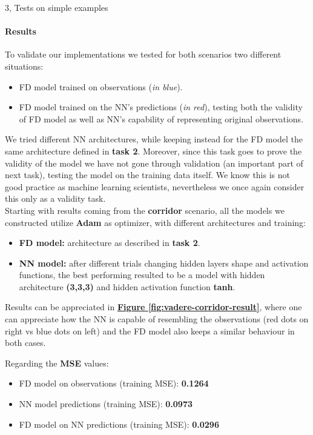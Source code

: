 \documentclass[10pt,a4paper]{article}
\begin{document}
\begin{task}{3, Tests on simple examples}
\paragraph{Results}
To validate our implementations we tested for both scenarios two different situations:
\begin{itemize}
    \item FD model trained on observations (\textit{in blue}).
    \item FD model trained on the NN's predictions (\textit{in red}), testing both the validity of FD model as well as NN's capability of representing original observations.
\end{itemize}
We tried different NN architectures, while keeping instead for the FD model the same architecture defined in \textbf{task 2}.
Moreover, since this task goes to prove the validity of the model we have not gone through validation (an important part of next task), testing the model on the training data itself. We know this is not good practice as machine learning scientists, nevertheless we once again consider this only as a validity task.\\
Starting with results coming from the \textbf{corridor} scenario, all the models we constructed utilize \textbf{Adam} as optimizer, with different architectures and training:
\begin{itemize}
    \item \textbf{FD model:} architecture as described in \textbf{task 2}.
    \item \textbf{NN model:} after different trials changing hidden layers shape and activation functions, the best performing resulted to be a model with hidden architecture \textbf{(3,3,3)} and hidden activation function \textbf{tanh}.
\end{itemize}

Results can be appreciated in \textbf{\hyperref[fig:vadere-corridor-result]{Figure \ref{fig:vadere-corridor-result}}}, where one can appreciate how the NN is capable of resembling the observations (red dots on right vs blue dots on left) and the FD model also keeps a similar behaviour in both cases.

Regarding the \textbf{MSE} values:
\begin{itemize}
    \item FD model on observations (training MSE): \textbf{0.1264}
    \item NN model predictions (training MSE): \textbf{0.0973}
    \item FD model on NN predictions (training MSE): \textbf{0.0296}
\end{itemize}


\end{task}
\end{document}
